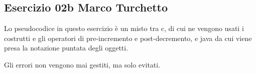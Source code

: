 
\subsection[02b MT]{Esercizio 02b Marco Turchetto}

Lo pseudocodice in questo esercizio è un misto tra c, di cui ne vengono usati i costrutti e
	gli operatori di pre-incremento e post-decremento, e java da cui viene presa la notazione
	puntata degli oggetti.

Gli errori non vengono mai gestiti, ma solo evitati.



